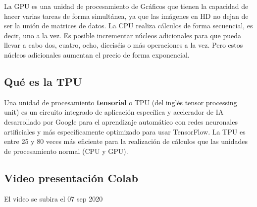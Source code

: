 \documentclass[
]{book}
\begin{document}
La GPU es una unidad de procesamiento de Gráficos que tienen la capacidad de hacer varias tareas de forma simultánea, ya que las imágenes en HD no dejan de ser la unión de matrices de datos\citep{DescripcionGPU}. La CPU realiza cálculos de forma secuencial, es decir, uno a la vez. Es posible incrementar núcleos adicionales para que pueda llevar a cabo dos, cuatro, ocho, dieciséis o más operaciones a la vez. Pero estos núcleos adicionales aumentan el precio de forma exponencial.

\hypertarget{quuxe9-es-la-tpu}{%
\subsection{Qué es la TPU}\label{quuxe9-es-la-tpu}}

Una unidad de procesamiento \textbf{tensorial} o TPU (del inglés tensor processing unit) es un circuito integrado de aplicación específica y acelerador de IA desarrollado por Google para el aprendizaje automático con redes neuronales artificiales y más específicamente optimizado para usar TensorFlow\citep{DescripcionTPU}. La TPU es entre 25 y 80 veces más eficiente para la realización de cálculos que las unidades de procesamiento normal (CPU y GPU).

\hypertarget{video-presentaciuxf3n-colab}{%
\subsection{Video presentación Colab}\label{video-presentaciuxf3n-colab}}

El video se subira el 07 sep 2020

  
\end{document}
